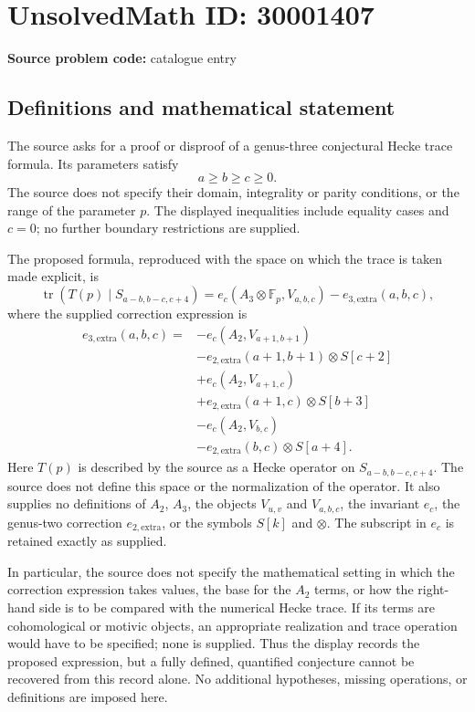 \documentclass[11pt]{article}
\begin{document}
\section*{UnsolvedMath ID: 30001407}
\textbf{Source problem code:} catalogue entry
\subsection{Definitions and mathematical statement}
The source asks for a proof or disproof of a genus-three conjectural Hecke trace formula. Its parameters satisfy
\[
a\geq b\geq c\geq 0.
\]
The source does not specify their domain, integrality or parity conditions, or the range of the parameter \(p\). The displayed inequalities include equality cases and \(c=0\); no further boundary restrictions are supplied.

The proposed formula, reproduced with the space on which the trace is taken made explicit, is
\[
\operatorname{tr}\!\left(T(p)\mid S_{a-b,b-c,c+4}\right)
=
e_c(A_3\otimes\mathbb{F}_p,V_{a,b,c})
-e_{3,\mathrm{extra}}(a,b,c),
\]
where the supplied correction expression is
\[
\begin{aligned}
e_{3,\mathrm{extra}}(a,b,c)
={}&-e_c(A_2,V_{a+1,b+1})\\
&-e_{2,\mathrm{extra}}(a+1,b+1)\otimes S[c+2]\\
&+e_c(A_2,V_{a+1,c})\\
&+e_{2,\mathrm{extra}}(a+1,c)\otimes S[b+3]\\
&-e_c(A_2,V_{b,c})\\
&-e_{2,\mathrm{extra}}(b,c)\otimes S[a+4].
\end{aligned}
\]
Here \(T(p)\) is described by the source as a Hecke operator on \(S_{a-b,b-c,c+4}\). The source does not define this space or the normalization of the operator. It also supplies no definitions of \(A_2\), \(A_3\), the objects \(V_{u,v}\) and \(V_{a,b,c}\), the invariant \(e_c\), the genus-two correction \(e_{2,\mathrm{extra}}\), or the symbols \(S[k]\) and \(\otimes\). The subscript in \(e_c\) is retained exactly as supplied.

In particular, the source does not specify the mathematical setting in which the correction expression takes values, the base for the \(A_2\) terms, or how the right-hand side is to be compared with the numerical Hecke trace. If its terms are cohomological or motivic objects, an appropriate realization and trace operation would have to be specified; none is supplied. Thus the display records the proposed expression, but a fully defined, quantified conjecture cannot be recovered from this record alone. No additional hypotheses, missing operations, or definitions are imposed here.
\end{document}
